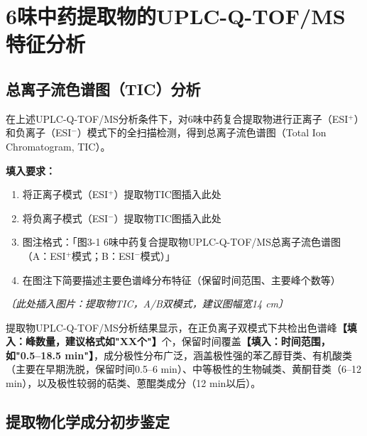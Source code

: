 \documentclass[12pt,a4paper,UTF8,openany]{ctexbook}
\begin{document}
\noindent{}

\vspace{1em}

\section{6味中药提取物的UPLC-Q-TOF/MS特征分析}

\subsection{总离子流色谱图（TIC）分析}

在上述UPLC-Q-TOF/MS分析条件下，对6味中药复合提取物进行正离子（ESI$^+$）和负离子（ESI$^-$）模式下的全扫描检测，得到总离子流色谱图（Total Ion Chromatogram, TIC）。

\vspace{0.5em}
\begin{tcolorbox}[colback=orange!5!white,colframe=orange!60!black,title={\textbf{【待填入】图3-1：提取物TIC色谱图}},fonttitle=\small\bfseries]
\textbf{填入要求：}
\begin{enumerate}
  \item 将正离子模式（ESI$^+$）提取物TIC图插入此处
  \item 将负离子模式（ESI$^-$）提取物TIC图插入此处
  \item 图注格式：「图3-1 6味中药复合提取物UPLC-Q-TOF/MS总离子流色谱图（A：ESI$^+$模式；B：ESI$^-$模式）」
  \item 在图注下简要描述主要色谱峰分布特征（保留时间范围、主要峰个数等）
\end{enumerate}
\textit{〔此处插入图片：提取物TIC，A/B双模式，建议图幅宽14 cm〕}
\end{tcolorbox}

提取物UPLC-Q-TOF/MS分析结果显示，在正负离子双模式下共检出色谱峰\textbf{【填入：峰数量，建议格式如"XX个"】}个，保留时间覆盖\textbf{【填入：时间范围，如"0.5--18.5 min"】}，成分极性分布广泛，涵盖极性强的苯乙醇苷类、有机酸类（主要在早期洗脱，保留时间0.5--6 min）、中等极性的生物碱类、黄酮苷类（6--12 min），以及极性较弱的萜类、蒽醌类成分（12 min以后）。

\subsection{提取物化学成分初步鉴定}
\end{document}
